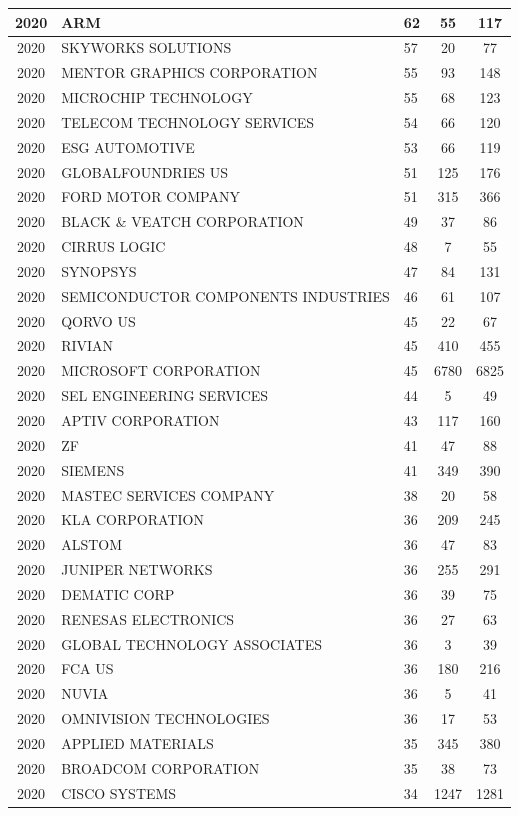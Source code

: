 \documentclass{article}%
\begin{document}
\begin{longtable}{c|p{20em}|p{5em}|c|c}
\hline%
2020&ARM&62&55&117\\%
\hline%
2020&SKYWORKS SOLUTIONS&57&20&77\\%
\hline%
2020&MENTOR GRAPHICS CORPORATION&55&93&148\\%
\hline%
2020&MICROCHIP TECHNOLOGY&55&68&123\\%
\hline%
2020&TELECOM TECHNOLOGY SERVICES&54&66&120\\%
\hline%
2020&ESG AUTOMOTIVE&53&66&119\\%
\hline%
2020&GLOBALFOUNDRIES US&51&125&176\\%
\hline%
2020&FORD MOTOR COMPANY&51&315&366\\%
\hline%
2020&BLACK \& VEATCH CORPORATION&49&37&86\\%
\hline%
2020&CIRRUS LOGIC&48&7&55\\%
\hline%
2020&SYNOPSYS&47&84&131\\%
\hline%
2020&SEMICONDUCTOR COMPONENTS INDUSTRIES&46&61&107\\%
\hline%
2020&QORVO US&45&22&67\\%
\hline%
2020&RIVIAN&45&410&455\\%
\hline%
2020&MICROSOFT CORPORATION&45&6780&6825\\%
\hline%
2020&SEL ENGINEERING SERVICES&44&5&49\\%
\hline%
2020&APTIV CORPORATION&43&117&160\\%
\hline%
2020&ZF&41&47&88\\%
\hline%
2020&SIEMENS&41&349&390\\%
\hline%
2020&MASTEC SERVICES COMPANY&38&20&58\\%
\hline%
2020&KLA CORPORATION&36&209&245\\%
\hline%
2020&ALSTOM&36&47&83\\%
\hline%
2020&JUNIPER NETWORKS&36&255&291\\%
\hline%
2020&DEMATIC CORP&36&39&75\\%
\hline%
2020&RENESAS ELECTRONICS&36&27&63\\%
\hline%
2020&GLOBAL TECHNOLOGY ASSOCIATES&36&3&39\\%
\hline%
2020&FCA US&36&180&216\\%
\hline%
2020&NUVIA&36&5&41\\%
\hline%
2020&OMNIVISION TECHNOLOGIES&36&17&53\\%
\hline%
2020&APPLIED MATERIALS&35&345&380\\%
\hline%
2020&BROADCOM CORPORATION&35&38&73\\%
\hline%
2020&CISCO SYSTEMS&34&1247&1281\\%

\end{longtable}
\end{document}
